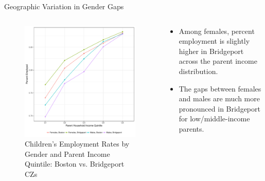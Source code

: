 \documentclass{beamer}
\begin{document}
\begin{frame}{Geographic Variation in Gender Gaps}
\begin{columns}
	
	\begin{column}{0.52\textwidth}
		\vspace{\topsep}
		\begin{figure}
			\vspace{-0.5cm}	
			\includegraphics[width=\columnwidth]{../fig2_new.pdf}
			\caption{{\scriptsize Children’s Employment Rates by Gender and Parent Income Quintile:
					Boston vs. Bridgeport CZs}}
		\end{figure}	
	\end{column}
	
	\begin{column}{0.4\textwidth}
		\vspace{-2.5cm}	
		\begin{itemize}
			\item Among females, percent employment is slightly higher in Bridgeport across the parent income distribution. 
			\item The gaps between females and males are much more pronounced in Bridgeport for low/middle-income parents.
		\end{itemize}
	\end{column}
	
\end{columns}
\end{frame}
\end{document}
